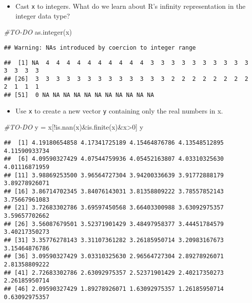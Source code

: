 \documentclass[
]{article}
\newenvironment{Shaded}{\begin{snugshade}}{\end{snugshade}}
\newcommand{\CommentTok}[1]{\textcolor[rgb]{0.56,0.35,0.01}{\textit{#1}}}
\newcommand{\DecValTok}[1]{\textcolor[rgb]{0.00,0.00,0.81}{#1}}
\newcommand{\FunctionTok}[1]{\textcolor[rgb]{0.00,0.00,0.00}{#1}}
\newcommand{\NormalTok}[1]{#1}
\newcommand{\OtherTok}[1]{\textcolor[rgb]{0.56,0.35,0.01}{#1}}
\newcommand{\SpecialCharTok}[1]{\textcolor[rgb]{0.00,0.00,0.00}{#1}}
\providecommand{\tightlist}{%
  \setlength{\itemsep}{0pt}\setlength{\parskip}{0pt}}
\begin{document}
\begin{itemize}
\tightlist
\item
  Cast \texttt{x} to integers. What do we learn about R's infinity
  representation in the integer data type?
\end{itemize}

\begin{Shaded}
\begin{Highlighting}[]
\CommentTok{\#TO{-}DO}
\FunctionTok{as.integer}\NormalTok{(x)}
\end{Highlighting}
\end{Shaded}

\begin{verbatim}
## Warning: NAs introduced by coercion to integer range
\end{verbatim}

\begin{verbatim}
##  [1] NA  4  4  4  4  4  4  4  4  4  4  3  3  3  3  3  3  3  3  3  3  3  3  3  3
## [26]  3  3  3  3  3  3  3  3  3  3  3  3  3  2  2  2  2  2  2  2  2  2  1  1  1
## [51]  0 NA NA NA NA NA NA NA NA NA NA NA
\end{verbatim}

\begin{itemize}
\tightlist
\item
  Use \texttt{x} to create a new vector \texttt{y} containing only the
  real numbers in x.
\end{itemize}

\begin{Shaded}
\begin{Highlighting}[]
\CommentTok{\#TO{-}DO}
\NormalTok{y }\OtherTok{=}\NormalTok{ x[}\SpecialCharTok{!}\FunctionTok{is.nan}\NormalTok{(x)}\SpecialCharTok{\&}\FunctionTok{is.finite}\NormalTok{(x)}\SpecialCharTok{\&}\NormalTok{x}\SpecialCharTok{\textgreater{}}\DecValTok{0}\NormalTok{]}
\NormalTok{y}
\end{Highlighting}
\end{Shaded}

\begin{verbatim}
##  [1] 4.19180654858 4.17341725189 4.15464876786 4.13548512895 4.11590933734
##  [6] 4.09590327429 4.07544759936 4.05452163807 4.03310325630 4.01116871959
## [11] 3.98869253500 3.96564727304 3.94200336639 3.91772888179 3.89278926071
## [16] 3.86714702345 3.84076143031 3.81358809222 3.78557852143 3.75667961083
## [21] 3.72683302786 3.69597450568 3.66403300988 3.63092975357 3.59657702662
## [26] 3.56087679501 3.52371901429 3.48497958377 3.44451784579 3.40217350273
## [31] 3.35776278143 3.31107361282 3.26185950714 3.20983167673 3.15464876786
## [36] 3.09590327429 3.03310325630 2.96564727304 2.89278926071 2.81358809222
## [41] 2.72683302786 2.63092975357 2.52371901429 2.40217350273 2.26185950714
## [46] 2.09590327429 1.89278926071 1.63092975357 1.26185950714 0.63092975357
\end{verbatim}
\end{document}
